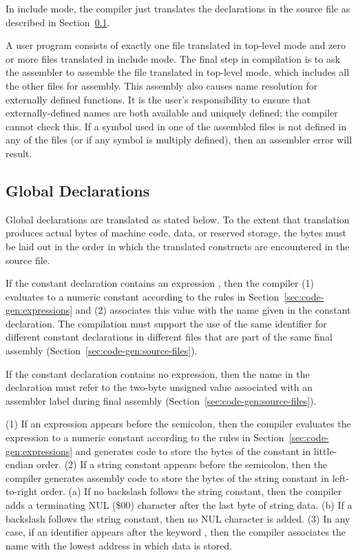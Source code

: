 \documentclass[10pt]{article}
\begin{document}
 In include mode, the compiler just translates
the declarations in the source file as described in
Section~\ref{sec:code-gen:global-decls}.

 A user program consists
of exactly one file translated in top-level mode and zero or more
files translated in include mode.  The final step in compilation is to
ask the assembler to assemble the file translated in top-level mode,
which includes all the other files for assembly.  This assembly also
causes name resolution for externally defined functions.  It is the
user's responsibility to ensure that externally-defined names are both
available and uniquely defined; the compiler cannot check this.  If a
symbol used in one of the assembled files is not defined in any of the
files (or if any symbol is multiply defined), then an assembler error
will result.

\subsection{Global Declarations}
\label{sec:code-gen:global-decls}

Global declarations are translated as stated below.  To the extent
that translation produces actual bytes of machine code, data, or
reserved storage, the bytes must be laid out in the order in which the
translated constructs are encountered in the source file.

 If the constant declaration contains
an expression , then the compiler (1) evaluates
 to a numeric constant according to the rules in
Section~\ref{sec:code-gen:expressions} and (2) associates this value
with the name given in the constant declaration.  The compilation must
support the use of the same identifier for different constant
declarations in different files that are part of the same final
assembly (Section~\ref{sec:code-gen:source-files}).

If the constant declaration contains no expression, then the name in
the declaration must refer to the two-byte unsigned value associated
with an assembler label during final assembly
(Section~\ref{sec:code-gen:source-files}).

 (1) If an expression appears before the
semicolon, then the compiler evaluates the expression to a numeric
constant according to the rules in
Section~\ref{sec:code-gen:expressions} and generates code to store the
bytes of the constant in little-endian order.  (2) If a string
constant appears before the semicolon, then the compiler generates
assembly code to store the bytes of the string constant in
left-to-right order.  (a) If no backslash \kwd{\bs} follows the string
constant, then the compiler adds a terminating NUL (\$00) character
after the last byte of string data. (b) If a backslash follows the
string constant, then no NUL character is added.  (3) In any case, if
an identifier appears after the keyword , then the compiler
associates the name with the lowest address in which data is stored.
\end{document}
